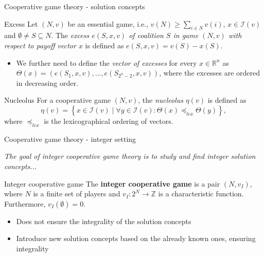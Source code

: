 \documentclass{beamer}
\newcommand{\Z}{\mathbb{Z}}
\begin{document}
\begin{frame}{Cooperative game theory - solution concepts}

    \begin{block}{Excess}
            Let $(N,v)$ be an essential game, i.e., $v(N) \geq \sum_{i \in N}v(i)$, $x \in \mathcal{I}(v)$ and $\emptyset \neq S \subseteq N$.
            The \emph{excess $e(S,x,v)$ of coalition $S$ in game $(N,v)$ with respect to payoff vector $x$} is defined as $e(S,x,v) = v(S) - x(S)$.
    \end{block}


    \begin{itemize}
        \item We further need to define the \emph{vector of excesses} for every $x \in \mathbb{R}^n$ as $\Theta(x)=\left(e(S_1,x,v), \dots, e(S_{2^{n}-2},x,v)\right)$, where the excesses are ordered in decreasing order.
    \end{itemize}


    \begin{block}{Nucleolus}
        For a cooperative game $(N,v)$, the \emph{nucleolus} $\eta(v)$ is defined as
        \begin{displaymath}
            \eta(v) = \left\{ x \in \mathcal{I}(v) \mid \forall y \in \mathcal{I}(v): \Theta(x) \preceq_{lex} \Theta(y)\right\},
        \end{displaymath}
        where $\preceq_{lex}$ is the lexicographical ordering of vectors.
    \end{block}
\end{frame}



\begin{frame}{Cooperative game theory - integer setting}

    \textit{The goal of integer cooperative game theory is to study and find integer solution concepts...}


    \begin{block}{Integer cooperative game}
        The \textbf{integer cooperative game} is a pair $(N, v_I)$, where $N$ is a finite set of players and $v_I: 2^N \to \Z$ is a characteristic function.
        Furthermore, $v_I(\emptyset) = 0$.
    \end{block}


    \begin{itemize}
        \item Does not ensure the integrality of the solution concepts
        \item Introduce new solution concepts based on the already known ones, ensuring integrality
    \end{itemize}

\end{frame}
\end{document}

